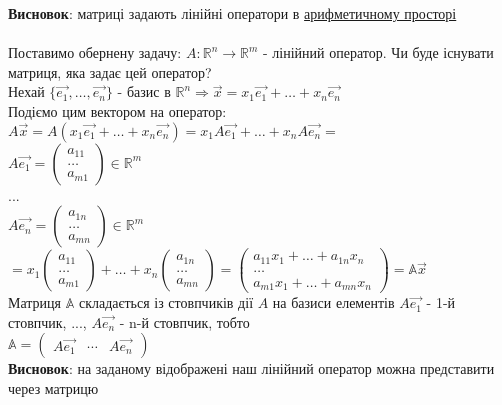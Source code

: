 \documentclass[a4paper, 14pt]{extarticle}
\begin{document}
	\textbf{Висновок}: матриці задають лінійні оператори в \underline{арифметичному просторі}\\
	\\
	Поставимо обернену задачу: $A: \mathbb{R}^n \to \mathbb{R}^m$ - лінійний оператор. Чи буде існувати матриця, яка задає цей оператор?\\
	Нехай $\{\vec{e_1},\dots, \vec{e_n}\}$ - базис в $\mathbb{R}^n \Rightarrow \vec{x} = x_1\vec{e_1} + \dots + x_n\vec{e_n}$\\
	Подіємо цим вектором на оператор:\\
	$A\vec{x} = A(x_1\vec{e_1} + \dots + x_n\vec{e_n}) = x_1A\vec{e_1} + \dots + x_nA\vec{e_n} \boxed{=}$\\
	$A\vec{e_1} = \begin{pmatrix} a_{11} \\ \dots \\ a_{m1} \end{pmatrix}	 \in \mathbb{R}^m$\\
	...\\
	$A\vec{e_n} = \begin{pmatrix} a_{1n} \\ \dots \\ a_{mn} \end{pmatrix}	 \in \mathbb{R}^m$\\
$\boxed{=} x_1 \begin{pmatrix} a_{11} \\ \dots \\ a_{m1} \end{pmatrix} + \dots +x_n \begin{pmatrix} a_{1n} \\ \dots \\ a_{mn} \end{pmatrix} = 	
\begin{pmatrix}
	a_{11}x_1 + \dots + a_{1n}x_n \\
	\dots \\
	a_{m1}x_1 + \dots + a_{mn}x_n
	\end{pmatrix} = \mathbb{A}\vec{x}$\\
	Матриця $\mathbb{A}$ складається із стовпчиків дії $A$ на базиси елементів $A\vec{e_1}$ - 1-й стовпчик, ..., $A\vec{e_n}$ - n-й стовпчик, тобто\\
	$\mathbb{A} = \begin{pmatrix} A\vec{e_1} & \cdots & A\vec{e_n} \end{pmatrix}$\\
	\textbf{Висновок}: на заданому відображені наш лінійний оператор можна представити через матрицю\\
\end{document}
